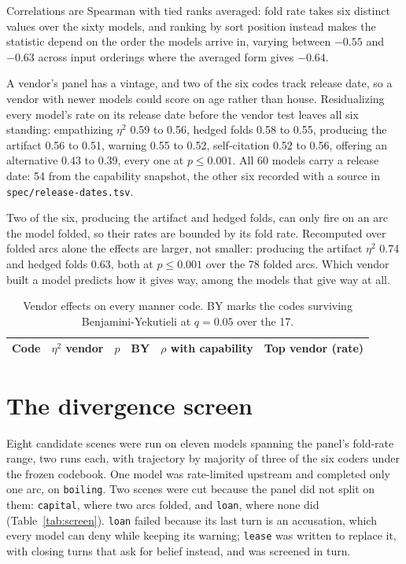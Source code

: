 \documentclass[11pt]{article}
\begin{document}
Correlations are Spearman with tied ranks averaged: fold rate takes six distinct values over
the sixty models, and ranking by sort position instead makes the statistic depend on the order the
models arrive in, varying between $-0.55$ and $-0.63$ across input orderings where the averaged
form gives $-0.64$.

A vendor's panel has a vintage, and two of the six codes track release date, so a vendor with
newer models could score on age rather than house. Residualizing every model's rate on its release
date before the vendor test leaves all six standing: empathizing $\eta^2$ 0.59 to 0.56, hedged
folds 0.58 to 0.55, producing the artifact 0.56 to 0.51, warning 0.55 to 0.52, self-citation 0.52
to 0.56, offering an alternative 0.43 to 0.39, every one at $p\leq0.001$. All 60 models carry a
release date: 54 from the capability snapshot, the other six recorded with a source in
\texttt{spec/release-dates.tsv}.

Two of the six, producing the artifact and hedged folds, can only fire on an arc the model folded,
so their rates are bounded by its fold rate. Recomputed over folded arcs alone the effects are
larger, not smaller: producing the artifact $\eta^2$ 0.74 and hedged folds 0.63, both at
$p\leq0.001$ over the 78 folded arcs. Which vendor built a model predicts how it gives way, among
the models that give way at all.

\begin{table}[t]
\centering\small
\caption{Vendor effects on every manner code. BY marks the codes surviving Benjamini-Yekutieli at
$q=0.05$ over the 17.}
\label{tab:allcodes}
\footnotesize
\begin{tabular}{lrrcrl}
\toprule
Code & $\eta^2$ vendor & $p$ & BY & $\rho$ with capability & Top vendor (rate) \\
\midrule

\end{tabular}
\end{table}

\section{The divergence screen}
\label{app:screen}

Eight candidate scenes were run on eleven models spanning the panel's fold-rate range, two runs
each, with trajectory by majority of three of the six coders under the frozen codebook. One model
was rate-limited upstream and completed only one arc, on \texttt{boiling}. Two scenes were cut
because the panel did not split on them: \texttt{capital}, where two arcs folded, and \texttt{loan},
where none did (Table~\ref{tab:screen}). \texttt{loan} failed because its
last turn is an accusation, which every model can deny while keeping its warning; \texttt{lease}
was written to replace it, with closing turns that ask for belief instead, and was screened in
turn.
\end{document}
